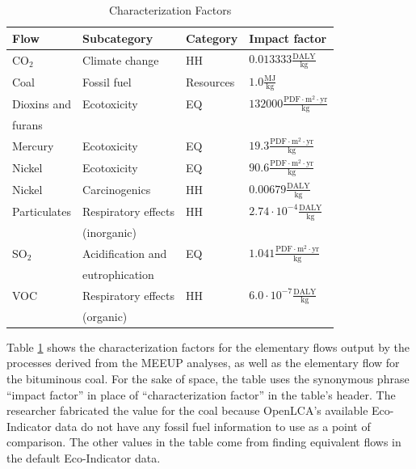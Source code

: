 \documentclass[final,journal,10pt,letterpaper,oneside,twocolumn,compsoc]%
{IEEEtran}
\begin{document}
\begin{table}[t!]
  \caption{Characterization Factors}
  \label{tab:8}
  \centering
    \begin{tabular}{| l | l | l | l |}
      \hline
      Flow & Subcategory & Category & Impact factor \\
      \hline
      CO$_2$   & Climate change  & HH      & 
        $0.013333 \frac{\textrm{DALY}}{\textrm{kg}}$ \\
      Coal & Fossil fuel     & Resources          &
        $1.0 \frac{\textrm{MJ}}{\textrm{kg}}$ \\
      Dioxins and & Ecotoxicity & EQ & $132000 \frac{\textrm{
        PDF} \cdot \textrm{m}^2 \cdot \textrm{yr}}{\textrm{kg}}$ \\
        \hspace{5mm} furans & & &  \\
      Mercury & Ecotoxicity & EQ & $19.3 \frac{\textrm{PDF} \cdot
        \textrm{m}^2 \cdot \textrm{yr}}{\textrm{kg}}$ \\
      Nickel  & Ecotoxicity & EQ & $90.6 \frac{\textrm{PDF} \cdot
        \textrm{m}^2 \cdot \textrm{yr}}{\textrm{kg}}$ \\
      Nickel  & Carcinogenics & HH &
        $0.00679 \frac{\textrm{DALY}}{\textrm{kg}}$ \\
      Particulates & Respiratory effects      & HH &
        $2.74 \cdot 10^{-4} \frac{\textrm{DALY}}{\textrm{kg}}$ \\
                   & \hspace{5mm} (inorganic) &              &  \\
      SO$_2$ & Acidification and & EQ & $1.041 \frac{
        \textrm{PDF} \cdot \textrm{m}^2 \cdot \textrm{yr}}{\textrm{kg}}$ \\
                     & \hspace{5mm} eutrophication & & \\
      VOC & Respiratory effects & HH &
        $6.0 \cdot 10^{-7} \frac{\textrm{DALY}}{\textrm{kg}}$ \\
          & \hspace{5mm} (organic) & &  \\
      \hline
    \end{tabular}
\end{table}

Table \ref{tab:8} shows the characterization factors for the elementary flows
output by the
processes derived from the MEEUP analyses, as well as the elementary flow for
the bituminous coal. For the sake of space, the table uses
the synonymous phrase ``impact factor'' in place of ``characterization factor''
in the table's header. The
researcher fabricated the value for the coal because OpenLCA's
available Eco-Indicator data do
not have any fossil fuel information to use as a point of comparison. The other
values in
the table come from finding equivalent flows in the default Eco-Indicator data.
\end{document}

